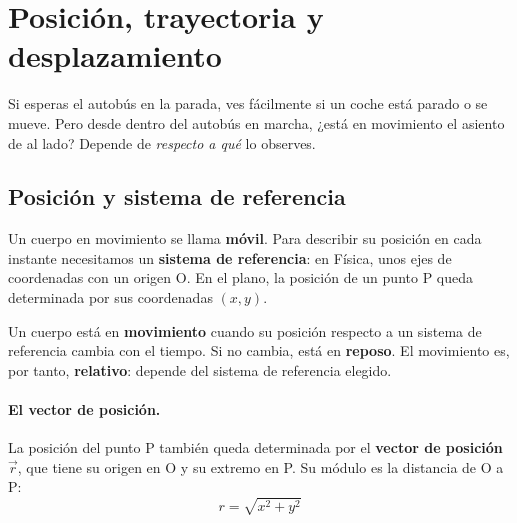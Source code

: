 %

\section{Posición, trayectoria y desplazamiento}

Si esperas el autobús en la parada, ves fácilmente si un coche está parado o se mueve. Pero desde dentro del autobús en marcha, ¿está en movimiento el asiento de al lado? Depende de \emph{respecto a qué} lo observes.

\subsection{Posición y sistema de referencia}

Un cuerpo en movimiento se llama \textbf{móvil}. Para describir su posición en cada instante necesitamos un \textbf{sistema de referencia}: en Física, unos ejes de coordenadas con un origen O. En el plano, la posición de un punto P queda determinada por sus coordenadas \((x, y)\).

\begin{definition}[Movimiento]
    Un cuerpo está en \textbf{movimiento} cuando su posición respecto a un sistema de referencia cambia con el tiempo. Si no cambia, está en \textbf{reposo}. El movimiento es, por tanto, \textbf{relativo}: depende del sistema de referencia elegido.
\end{definition}

\paragraph{El vector de posición.} La posición del punto P también queda determinada por el \textbf{vector de posición} \(\vec{r}\), que tiene su origen en O y su extremo en P. Su módulo es la distancia de O a P:
\[ r = \sqrt{x^2 + y^2} \]

